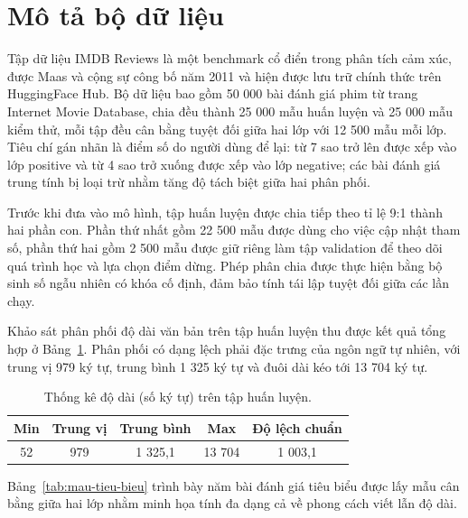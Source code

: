 \section{Mô tả bộ dữ liệu}

Tập dữ liệu IMDB Reviews là một benchmark cổ điển trong phân tích cảm xúc, được Maas và cộng sự công bố năm 2011 và hiện được lưu trữ chính thức trên HuggingFace Hub. Bộ dữ liệu bao gồm 50 000 bài đánh giá phim từ trang Internet Movie Database, chia đều thành 25 000 mẫu huấn luyện và 25 000 mẫu kiểm thử, mỗi tập đều cân bằng tuyệt đối giữa hai lớp với 12 500 mẫu mỗi lớp. Tiêu chí gán nhãn là điểm số do người dùng để lại: từ 7 sao trở lên được xếp vào lớp positive và từ 4 sao trở xuống được xếp vào lớp negative; các bài đánh giá trung tính bị loại trừ nhằm tăng độ tách biệt giữa hai phân phối.

Trước khi đưa vào mô hình, tập huấn luyện được chia tiếp theo tỉ lệ 9:1 thành hai phần con. Phần thứ nhất gồm 22 500 mẫu được dùng cho việc cập nhật tham số, phần thứ hai gồm 2 500 mẫu được giữ riêng làm tập validation để theo dõi quá trình học và lựa chọn điểm dừng. Phép phân chia được thực hiện bằng bộ sinh số ngẫu nhiên có khóa cố định, đảm bảo tính tái lập tuyệt đối giữa các lần chạy.

Khảo sát phân phối độ dài văn bản trên tập huấn luyện thu được kết quả tổng hợp ở Bảng~\ref{tab:thong-ke-do-dai}. Phân phối có dạng lệch phải đặc trưng của ngôn ngữ tự nhiên, với trung vị 979 ký tự, trung bình 1 325 ký tự và đuôi dài kéo tới 13 704 ký tự.

\begin{table}[htbp]
\centering
\caption{Thống kê độ dài (số ký tự) trên tập huấn luyện.}
\label{tab:thong-ke-do-dai}
\begin{tabular}{ccccc}
\hline
\textbf{Min} & \textbf{Trung vị} & \textbf{Trung bình} & \textbf{Max} & \textbf{Độ lệch chuẩn} \\ \hline
52           & 979               & 1 325,1             & 13 704       & 1 003,1                \\ \hline
\end{tabular}
\end{table}

Bảng~\ref{tab:mau-tieu-bieu} trình bày năm bài đánh giá tiêu biểu được lấy mẫu cân bằng giữa hai lớp nhằm minh họa tính đa dạng cả về phong cách viết lẫn độ dài.

